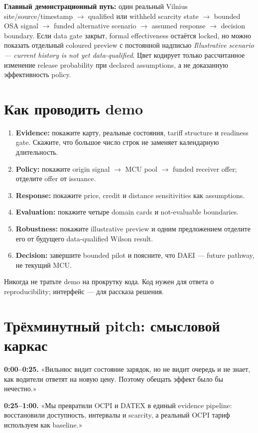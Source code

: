 \documentclass[11pt,a4paper]{article}
\begin{document}
\textbf{Главный демонстрационный путь:} один реальный Vilnius site/source/timestamp $\to$ qualified или withheld scarcity state $\to$ bounded OSA signal $\to$ funded alternative scenario $\to$ assumed response $\to$ decision boundary. Если data gate закрыт, formal effectiveness остаётся locked, но можно показать отдельный coloured preview с постоянной надписью \emph{Illustrative scenario --- current history is not yet data-qualified}. Цвет кодирует только рассчитанное изменение release probability при declared assumptions, а не доказанную эффективность policy.

\section{Как проводить demo}
\begin{enumerate}
\item \textbf{Evidence:} покажите карту, реальные состояния, tariff structure и readiness gate. Скажите, что большое число строк не заменяет календарную длительность.
\item \textbf{Policy:} покажите origin signal $\rightarrow$ MCU pool $\rightarrow$ funded receiver offer; отделите offer от issuance.
\item \textbf{Response:} покажите price, credit и distance sensitivities как assumptions.
\item \textbf{Evaluation:} покажите четыре domain cards и not-evaluable boundaries.
\item \textbf{Robustness:} покажите illustrative preview и одним предложением отделите его от будущего data-qualified Wilson result.
\item \textbf{Decision:} завершите bounded pilot и поясните, что DAEI --- future pathway, не текущий MCU.
\end{enumerate}
Никогда не тратьте demo на прокрутку кода. Код нужен для ответа о reproducibility; интерфейс --- для рассказа решения.

\section{Трёхминутный pitch: смысловой каркас}
\textbf{0:00--0:25.} «Вильнюс видит состояние зарядок, но не видит очередь и не знает, как водители ответят на новую цену. Поэтому обещать эффект было бы нечестно.»

\textbf{0:25--1:00.} «Мы превратили OCPI и DATEX в единый evidence pipeline: восстановили доступность, интервалы и scarcity, а реальный OCPI тариф используем как baseline.»
\end{document}
